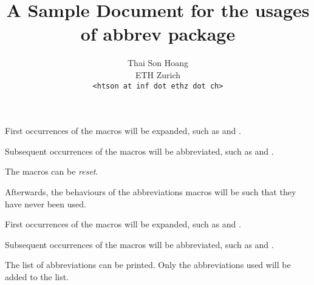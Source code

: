 \title{A Sample Document for the usages of \textsf{abbrev} package}
\author{Thai Son Hoang\\ETH Zurich\\\texttt{<htson at inf dot ethz dot
    ch>}}


\maketitle


First occurrences of the macros will be expanded, such as \SMEs and \randd.

Subsequent occurrences of the macros will be abbreviated, such as \SME
and \randds.

The macros can be \emph{reset}.
\resetabbrev

Afterwards, the behaviours of the abbreviations macros will be such
that they have never been used.

First occurrences of the macros will be expanded, such as \SMEs and \randd.

Subsequent occurrences of the macros will be abbreviated, such as \SME
and \randds.

The list of abbreviations can be printed.  Only the abbreviations used
will be added to the list.
\printnomenclature


